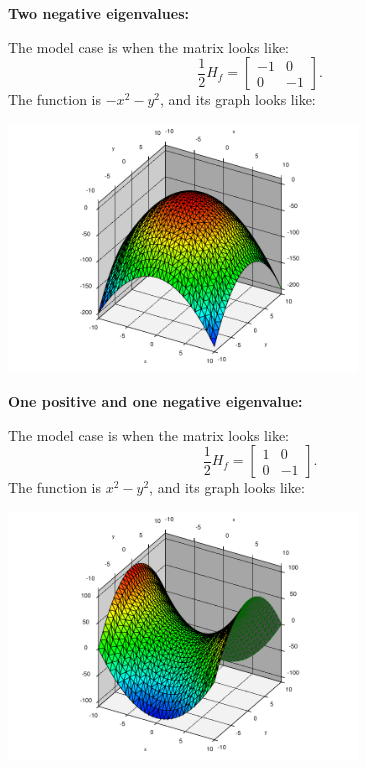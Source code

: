 \documentclass[12pt]{article}
\begin{document}
\bigskip

\pagebreak[3]
\textbf{Two negative eigenvalues:}
\nopagebreak

The model case is when the matrix looks like:
\[
\frac{1}{2} H_f
=
\begin{bmatrix}
-1 & 0 \\
0 & -1
\end{bmatrix} .
\]
The function is $-x^2-y^2$, and
its graph looks like:
\begin{center}
\includegraphics[width=3.65in]{minusxsqminusysq}
\end{center}

\bigskip

\pagebreak[2]
\textbf{One positive and one negative eigenvalue:}

The model case is when the matrix looks like:
\[
\frac{1}{2} H_f
=
\begin{bmatrix}
1 & 0 \\
0 & -1
\end{bmatrix} .
\]
The function is $x^2-y^2$, and
its graph looks like:
\begin{center}
\includegraphics[width=3.65in]{xsqminusysq}
\end{center}

\bigskip
\end{document}
